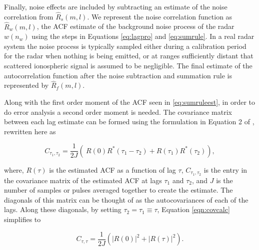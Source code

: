 



Finally, noise effects are included by subtracting an estimate of the noise correlation from $\widehat{R}_s(m,l)$.  We represent the noise correlation function as $\widehat{R}_w(m,l)$, the ACF estimate of the background noise process of the radar $w(n_w)$ using the steps in Equations \ref{eq:lagpro} and \ref{eq:sumrule}. In a real radar system the noise process is typically sampled either during a calibration period for the radar when nothing is being emitted, or at ranges sufficiently distant that scattered ionospheric signal is assumed to be negligible. The final estimate of the autocorrelation function after the noise subtraction and summation rule is represented by $\widehat{R}_f(m,l)$.

Along with the first order moment of the ACF seen in \ref{eq:sumruleest}, in order to do error analysis a second order moment is needed. The covariance matrix between each lag estimate can be formed using the formulation in Equation 2 of \cite{hysell2008}, rewritten here as

\begin{equation}
\label{eqn:covcalc}
C_{\tau_1,\tau_2} = \frac{1}{2J} \left( \ R(0)  R^*(\tau_1-\tau_2) +  R(\tau_1) R^*(\tau_2) \right),
\end{equation}

\noindent where, $R(\tau)$ is the estimated ACF as a function of lag $\tau$, $C_{\tau_1,\tau_2}$ is the entry in the covariance matrix of the estimated ACF at lags $\tau_1$ and $\tau_2$,  and $J$ is the number of samples or pulses averaged together to create the estimate. The diagonals of this matrix can be thought of as the autocovariances of each of the lags.  Along these diagonals, by setting $\tau_2 = \tau_1 \equiv \tau$, Equation \ref{eqn:covcalc} simplifies to

\begin{equation}
\label{eqn:covdiag}
C_{\tau,\tau} = \frac{1}{2J} \left(  |R(0)|^2 +|R(\tau)|^2\right).
\end{equation}

